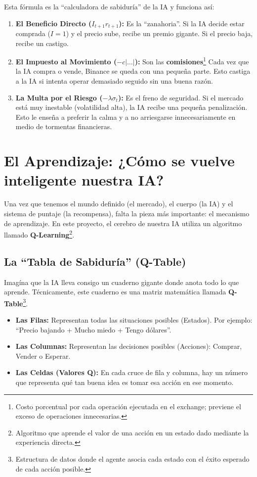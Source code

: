 \documentclass[12pt,a4paper]{article}
\begin{document}
Esta fórmula es la ``calculadora de sabiduría'' de la IA y funciona así:
\begin{enumerate}
    \item \textbf{El Beneficio Directo ($I_{t+1}r_{t+1}$):} Es la ``zanahoria''. Si la IA decide estar comprada ($I=1$) y el precio sube, recibe un premio gigante. Si el precio baja, recibe un castigo.
    \item \textbf{El Impuesto al Movimiento ($-c|\dots|$):} Son las \textbf{comisiones}\footnote{Costo porcentual por cada operación ejecutada en el exchange; previene el exceso de operaciones innecesarias.} Cada vez que la IA compra o vende, Binance se queda con una pequeña parte. Esto castiga a la IA si intenta operar demasiado seguido sin una buena razón.
    \item \textbf{La Multa por el Riesgo ($-\lambda \sigma_t$):} Es el freno de seguridad. Si el mercado está muy inestable (volatilidad alta), la IA recibe una pequeña penalización. Esto le enseña a preferir la calma y a no arriesgarse innecesariamente en medio de tormentas financieras.
\end{enumerate}

\section{El Aprendizaje: ¿Cómo se vuelve inteligente nuestra IA?}

Una vez que tenemos el mundo definido (el mercado), el cuerpo (la IA) y el sistema de puntaje (la recompensa), falta la pieza más importante: el mecanismo de aprendizaje. En este proyecto, el cerebro de nuestra IA utiliza un algoritmo llamado \textbf{Q-Learning}\footnote{Algoritmo que aprende el valor de una acción en un estado dado mediante la experiencia directa.}.

\subsection{La ``Tabla de Sabiduría'' (Q-Table)}

Imagína que la IA lleva consigo un cuaderno gigante donde anota todo lo que aprende. Técnicamente, este cuaderno es una matriz matemática llamada \textbf{Q-Table}\footnote{Estructura de datos donde el agente asocia cada estado con el éxito esperado de cada acción posible.}. 

\begin{itemize}
    \item \textbf{Las Filas:} Representan todas las situaciones posibles (Estados). Por ejemplo: ``Precio bajando + Mucho miedo + Tengo dólares''.
    \item \textbf{Las Columnas:} Representan las decisiones posibles (Acciones): Comprar, Vender o Esperar.
    \item \textbf{Las Celdas (Valores Q):} En cada cruce de fila y columna, hay un número que representa qué tan buena idea es tomar esa acción en ese momento.
\end{itemize}
\end{document}
